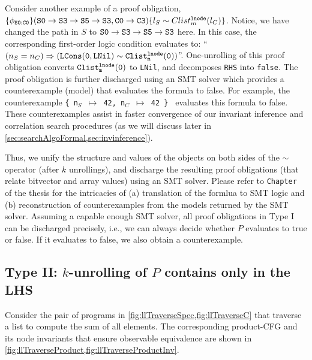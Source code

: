 Consider another example of a proof obligation,
$\{\phi_{{\tt S0:C0}}\} ({\tt S0\rightarrow S3\rightarrow S5\rightarrow S3}, \\{\tt C0\rightarrow C3}) \{l_{S}\sim{}Clist^{{\tt lnode}}_{m}(l_{C})\}$.
Notice, we have changed the path in $S$ to ${\tt S0\rightarrow S3\rightarrow S5\rightarrow S3}$ here.
In this case, the corresponding first-order logic condition evaluates
to: ``$(n_S=n_C)\Rightarrow({\tt LCons(0, LNil)}\sim{}{\tt Clist^{{\tt lnode}}_{m}(0)})$''.
One-unrolling of this proof obligation converts
${\tt Clist^{{\tt lnode}}_{m}(0)}$ to {\tt LNil}, and
decomposes {\tt RHS} into {\tt false}.
The proof obligation is further discharged using an SMT solver
which provides a counterexample (model) that evaluates the
formula to false. For example, the counterexample {\tt \{ n$_S$ $\mapsto$ 42, n$_C$ $\mapsto$ 42 \} }
evaluates this formula to false.
These counterexamples
assist in faster convergence
of our invariant inference and correlation search procedures (as we will discuss later in \cref{sec:searchAlgoFormal,sec:invinference}).

Thus, we unify the structure and
values of the \SpecL{} objects on both sides of
the $\sim$ operator (after $k$ unrollings), and discharge the resulting
proof obligations (that relate bitvector and array values) using an SMT solver.
Please refer to {\tt Chapter \ThesisChapterAlgo{}} of the thesis for
the intricacies of (a) translation of the formlua to SMT logic and (b) reconstruction
of counterexamples from the models returned by the SMT solver.
Assuming a capable enough SMT solver,
all proof obligations in Type I can be discharged precisely, i.e.,
we can always decide whether $P$ evaluates to true or false. If it
evaluates to false, we also obtain a counterexample.



\subsection[Handling Type II Proof Obligations]{Type II: $k$-unrolling of $P$ contains \recursiveRelations{} only in the LHS}
\label{sec:cat2}

Consider the pair of programs in \cref{fig:llTraverseSpec,fig:llTraverseC}
that traverse a list to compute the sum of all elements.
The corresponding product-CFG and its node
invariants that ensure observable
equivalence are shown in \cref{fig:llTraverseProduct,fig:llTraverseProductInv}.


